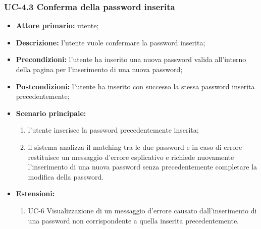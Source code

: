 \subsubsection{UC-4.3 Conferma della password inserita}
\begin{itemize}
	\item \textbf{Attore primario:} utente;

	\item \textbf{Descrizione:} l'utente vuole confermare la password inserita;

	\item \textbf{Precondizioni:} l'utente ha inserito una nuova password valida all'interno della pagina per l'inserimento di una nuova password;

	\item \textbf{Postcondizioni:} l'utente ha inserito con successo la stessa password inserita precedentemente;

	\item \textbf{Scenario principale:}
	      \begin{enumerate}
		      \item l'utente inserisce la password precedentemente inserita;
		      \item il sistema analizza il matching tra le due password e in caso di errore restituisce un messaggio d'errore esplicativo e richiede nuovamente l'inserimento di una nuova password senza precedentemente completare la modifica della password.
	      \end{enumerate}
	\item \textbf{Estensioni:}
	      \begin{enumerate}
		      \item UC-6 Visualizzazione di un messaggio d'errore causato dall'inserimento di una password non corrispondente a quella inserita precedentemente.
	      \end{enumerate}
\end{itemize}

